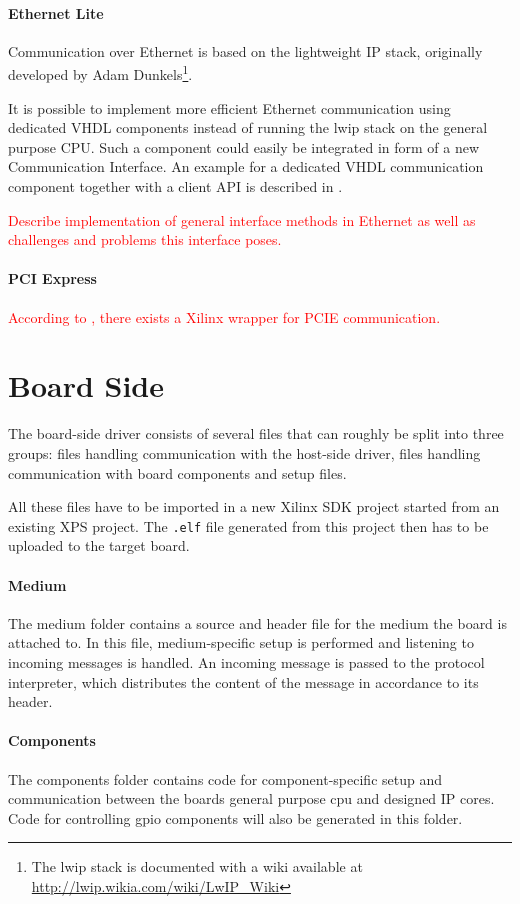 \documentclass{report}
\begin{document}
\paragraph{Ethernet Lite}
Communication over Ethernet is based on the lightweight IP stack, originally developed by Adam Dunkels\footnote{The lwip stack is documented with a wiki available at \url{http://lwip.wikia.com/wiki/LwIP_Wiki}}.

It is possible to implement more efficient Ethernet communication using dedicated VHDL components instead of running the lwip stack on the general purpose CPU. Such a component could easily be integrated in form of a new Communication Interface. An example for a dedicated VHDL communication component together with a client API is described in \cite{alachiotis10, alachiotis12}.

\textcolor{red}{Describe implementation of general interface methods in Ethernet as well as challenges and problems this interface poses.}

\paragraph{PCI Express}
\textcolor{red}{According to \cite{alachiotis10}, there exists a Xilinx wrapper for PCIE communication.}

\newpage
\section{Board Side}
The board-side driver consists of several files that can roughly be split into three groups: files handling communication with the host-side driver, files handling communication with board components and setup files.

All these files have to be imported in a new Xilinx SDK project started from an existing XPS project. The \texttt{.elf} file generated from this project then has to be uploaded to the target board.

\paragraph{Medium}
The medium folder contains a source and header file for the medium the board is attached to. In this file, medium-specific setup is performed and listening to incoming messages is handled. An incoming message is passed to the protocol interpreter, which distributes the content of the message in accordance to its header.

\paragraph{Components}
The components folder contains code for component-specific setup and communication between the boards general purpose cpu and designed IP cores. Code for controlling gpio components will also be generated in this folder.
\end{document}
